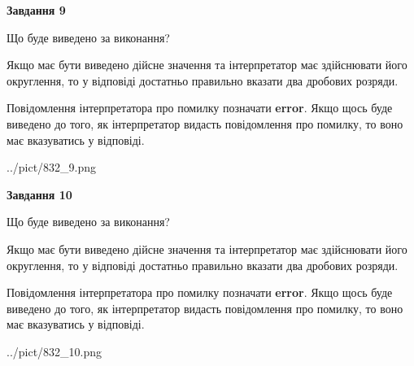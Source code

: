 \documentclass[12pt, ukrainian]{article}
\begin{document}
{\begin {Large}
{\begin {center}\textbf{Завдання 9}\end {center}}\par
Що буде виведено за виконання? \par

Якщо має бути виведено дійсне значення та інтерпретатор має здійснювати його округлення, 
то у відповіді достатньо правильно вказати два дробових розряди.

Повідомлення інтерпретатора про помилку позначати \textbf{error}.
Якщо щось буде виведено до того, як інтерпретатор видасть повідомлення про помилку, 
то воно має вказуватись у відповіді. \par

\begin{center}
	{../pict/832_9.png}
\end{center}
\newpage

{\begin {center}\textbf{Завдання 10}\end {center}}\par
Що буде виведено за виконання? \par

Якщо має бути виведено дійсне значення та інтерпретатор має здійснювати його округлення, 
то у відповіді достатньо правильно вказати два дробових розряди.

Повідомлення інтерпретатора про помилку позначати \textbf{error}.
Якщо щось буде виведено до того, як інтерпретатор видасть повідомлення про помилку, 
то воно має вказуватись у відповіді. \par

\begin{center}
	{../pict/832_10.png}
\end{center}
\newpage

\end {Large}}
\end{document}
